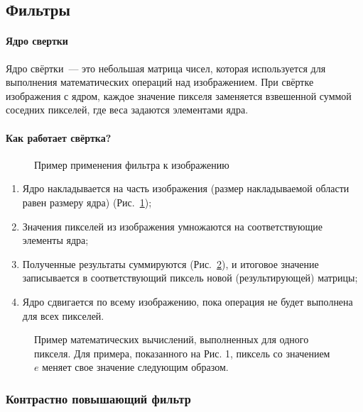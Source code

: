 
\subsection{Фильтры}
\paragraph{Ядро свертки}
Ядро свёртки~--- это небольшая матрица чисел, которая используется для выполнения математических операций над изображением. При свёртке изображения с ядром, каждое значение пикселя заменяется взвешенной суммой соседних пикселей, где веса задаются элементами ядра.
\paragraph{Как работает свёртка?}

\begin{figure}[h]
    \centering
    
    \caption{Пример применения фильтра к изображению}
    \label{fig:kernel}
\end{figure}

\begin{enumerate}
    \item Ядро накладывается на часть изображения (размер накладываемой области равен размеру ядра) (Рис.~\ref{fig:kernel});
    \item Значения пикселей из изображения умножаются на соответствующие элементы ядра;
    \item Полученные результаты суммируются (Рис.~\ref{fig:kernel_2}), и итоговое значение записывается в соответствующий пиксель новой (результирующей) матрицы;
    \item Ядро сдвигается по всему изображению, пока операция не будет выполнена для всех пикселей.
\end{enumerate}

\begin{figure}[h]
    \centering
    
    \caption{Пример математических вычислений, выполненных для одного пикселя. Для примера, показанного на Рис. 1, пиксель со значением $e$ меняет свое значение следующим образом.}
    \label{fig:kernel_2}
\end{figure}

\subsubsection{Контрастно повышающий фильтр}

